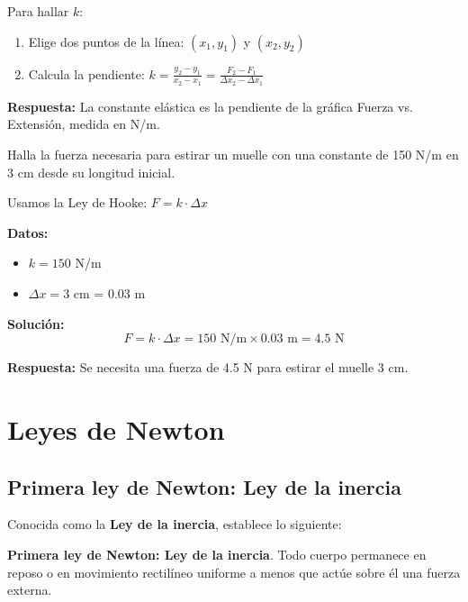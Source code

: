 \begin{exercise}
\begin{solu}
        Para hallar $k$:
        \begin{enumerate}
            \item Elige dos puntos de la línea: $(x_1, y_1)$ y $(x_2, y_2)$
            \item Calcula la pendiente: $k = \frac{y_2 - y_1}{x_2 - x_1} = \frac{F_2 - F_1}{\Delta x_2 - \Delta x_1}$
        \end{enumerate}

        \textbf{Respuesta:} La constante elástica es la pendiente de la gráfica Fuerza vs. Extensión, medida en N/m.
    \end{solu}
\end{exercise}

\begin{exercise}
    Halla la fuerza necesaria para estirar un muelle con una constante de 150 N/m en 3 cm desde su longitud inicial.

    \begin{solu}
        Usamos la Ley de Hooke: $F = k \cdot \Delta x$

        \textbf{Datos:}
        \begin{itemize}
            \item $k = 150$ N/m
            \item $\Delta x = 3$ cm = 0.03 m
        \end{itemize}

        \textbf{Solución:}
        $$F = k \cdot \Delta x = 150\text{ N/m} \times 0.03\text{ m} = 4.5\text{ N}$$

        \textbf{Respuesta:} Se necesita una fuerza de 4.5 N para estirar el muelle 3 cm.
    \end{solu}
\end{exercise}


\section{Leyes de Newton}

\subsection{Primera ley de Newton: Ley de la inercia}

Conocida como la \textbf{Ley de la inercia}, establece lo siguiente:
\begin{dBox}
    \textbf{Primera ley de Newton: Ley de la inercia}. Todo cuerpo permanece en reposo o en movimiento rectilíneo uniforme a menos que actúe sobre él una fuerza externa.
\end{dBox}


